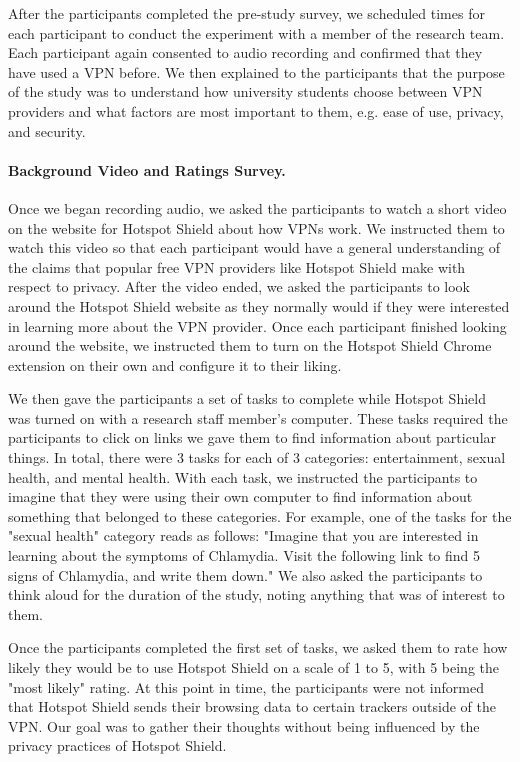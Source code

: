 After the participants completed the pre-study survey, we scheduled times for
each participant to conduct the experiment with a member of the research team.
Each participant again consented to audio recording and confirmed that they
have used a VPN before.  We then explained to the participants that the
purpose of the study was to understand how university students choose between
VPN providers and what factors are most important to them, e.g. ease of use,
privacy, and security.

\paragraph{Background Video and Ratings Survey.}
Once we began recording audio, we asked the participants to watch a short
video on the website for Hotspot Shield about how VPNs work.  We instructed
them to watch this video so that each participant would have a general
understanding of the claims that popular free VPN providers like Hotspot
Shield make with respect to privacy.  After the video ended, we asked the
participants to look around the Hotspot Shield website as they normally would
if they were interested in learning more about the VPN provider.  Once each
participant finished looking around the website, we instructed them to turn on
the Hotspot Shield Chrome extension on their own and configure it to their
liking.

We then gave the participants a set of tasks to complete while Hotspot Shield
was turned on with a research staff member's computer.  These tasks required
the participants to click on links we gave them to find information about
particular things.  In total, there were 3 tasks for each of 3 categories:
entertainment, sexual health, and mental health.  With each task, we
instructed the participants to imagine that they were using their own computer
to find information about something that belonged to these categories.  For
example, one of the tasks for the "sexual health" category reads as follows:
"Imagine that you are interested in learning about the symptoms of Chlamydia.
Visit the following link to find 5 signs of Chlamydia, and write them down."
We also asked the participants to think aloud for the duration of the study,
noting anything that was of interest to them.

Once the participants completed the first set of tasks, we asked them to rate
how likely they would be to use Hotspot Shield on a scale of 1 to 5, with 5
being the "most likely" rating.  At this point in time, the participants were not
informed that Hotspot Shield sends their browsing data to certain trackers
outside of the VPN.  Our goal was to gather their thoughts without being
influenced by the privacy practices of Hotspot Shield.

